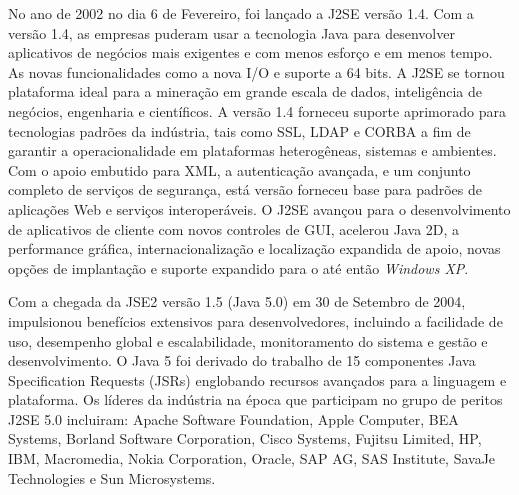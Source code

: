 No ano de 2002 no dia 6 de Fevereiro, foi lançado a J2SE vers\~{a}o 1.4. Com a vers\~{a}o 1.4, as empresas puderam usar a tecnologia Java para desenvolver aplicativos de neg\'{o}cios mais exigentes e com menos esforço e em menos tempo. As novas funcionalidades como a nova I/O e suporte a 64 bits. A J2SE se tornou plataforma ideal para a mineraç\~{a}o em grande escala de dados, inteligência de neg\'{o}cios, engenharia e cient\'{i}ficos. A vers\~{a}o 1.4 forneceu suporte aprimorado para tecnologias padr\~{o}es da ind\'{u}stria, tais como SSL, LDAP e CORBA a fim de garantir a operacionalidade em plataformas heterogêneas, sistemas e ambientes. Com o apoio embutido para XML, a autenticaç\~{a}o avançada, e um conjunto completo de serviços de segurança, est\'{a} vers\~{a}o forneceu base para padr\~{o}es de aplicaç\~{o}es Web e serviços interoper\'{a}veis. O J2SE avançou para o desenvolvimento de aplicativos de cliente com novos controles de GUI, acelerou Java 2D, a performance gr\'{a}fica, internacionalizaç\~{a}o e localizaç\~{a}o expandida de apoio, novas opç\~{o}es de implantaç\~{a}o e suporte expandido para o at\'{e} ent\~{a}o {\it Windows XP}.

Com a chegada da \acs{JSE2} vers\~{a}o 1.5 (Java 5.0) em 30 de Setembro de 2004, impulsionou benef\'{i}cios extensivos para desenvolvedores, incluindo a facilidade de uso, desempenho global e escalabilidade, monitoramento do sistema e gest\~{a}o e desenvolvimento. O Java 5 foi derivado do trabalho de 15 componentes Java Specification Requests (JSRs) englobando recursos avançados para a linguagem e plataforma. Os l\'{i}deres da ind\'{u}stria na \'{e}poca que participam no grupo de peritos J2SE 5.0 incluiram: Apache Software Foundation, Apple Computer, BEA Systems, Borland Software Corporation, Cisco Systems, Fujitsu Limited, HP, IBM, Macromedia, Nokia Corporation, Oracle, SAP AG, SAS Institute, SavaJe Technologies e Sun Microsystems.

